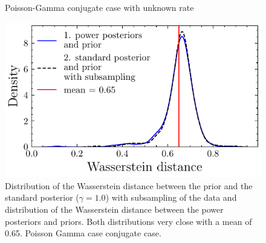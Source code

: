 \documentclass[12pt]{article}
\begin{document}
\begin{figure}[htbp]
    \centering
    \hfill %

    \caption{Poisson-Gamma conjugate case with unknown rate}
    \label{fig:poisson_ga_conju}
\end{figure}

\begin{figure}
\begin{center}
\includegraphics{imgs/poisson_gamma_subsample.pdf}
\end{center}
\caption{Distribution of the Wasserstein distance between the prior and the standard posterior ($\gamma=1.0$) with subsampling of the data and distribution of the Wasserstein distance between the power posteriors and priors. Both distributions very close with a mean of 0.65. Poisson Gamma case conjugate case.}\label{fig:poisson_gamma_sub}
\end{figure}
\end{document}
